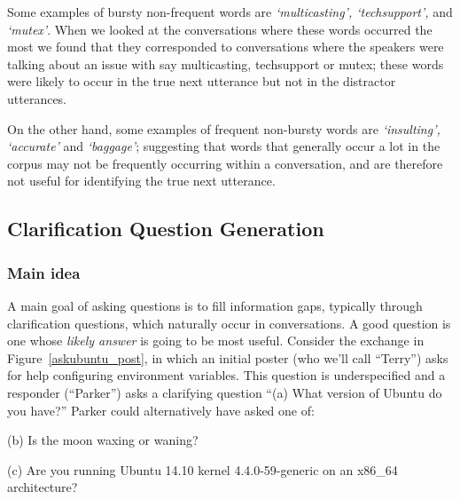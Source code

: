 \documentclass[11pt]{article}
\begin{document}
Some examples of bursty non-frequent words are \textit{`multicasting',
`techsupport',} and  \textit{`mutex'}.  When we looked at the
conversations where these words occurred the most we found that they
corresponded to conversations where the speakers were talking about an
issue with say multicasting, techsupport or mutex; these words were likely
to occur in the true next utterance but not in the distractor utterances.

On the other hand, some examples of frequent non-bursty words are
\textit{`insulting', `accurate'} and \textit{`baggage'}; suggesting that
words that generally occur a lot in the corpus may not be frequently
occurring within a conversation, and are therefore not useful for
identifying the true next utterance.


\subsection{Clarification Question Generation}

\subsubsection{Main idea}

A main goal of asking questions is to fill information gaps, typically through clarification questions, which naturally occur in conversations. 
A good question is one whose \emph{likely answer} is going to be most useful.
Consider the exchange in Figure~\ref{askubuntu_post}, in which an initial poster (who we'll call ``Terry'') asks for help configuring environment variables.
This question is underspecified and a responder (``Parker'') asks a clarifying question ``\textsf{\small (a) What version of Ubuntu do you have?}''
Parker could alternatively have asked one of:

\textsf{\small(b) Is the moon waxing or waning?}

\textsf{\small(c) Are you running Ubuntu 14.10 kernel 4.4.0-59-generic on an x86\_64 architecture?}
\end{document}

